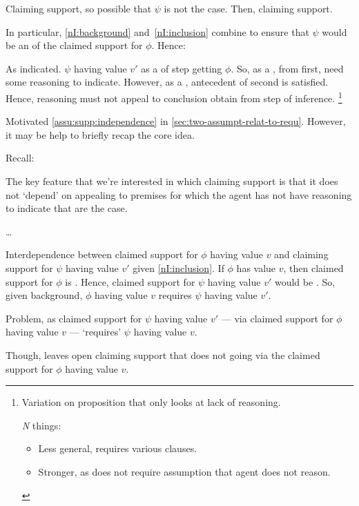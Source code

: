 \begin{note}
  Claiming support, so possible that \(\psi\) is not the case.
  Then, claiming support.

  In particular, \ref{nI:background} and~\ref{nI:inclusion} combine to ensure that \(\psi\) would be an \requ{} of the claimed support for \(\phi\).
  Hence:

  \begin{quote}
    \vspace{-\baselineskip}
    \assuCSRReq*
  \end{quote}

  As indicated.
  \(\psi\) having value \(v'\) as a \prequ{} of step getting \(\phi\).
  So, as a \requ{}, from first, need some reasoning to indicate.
  However, as a \prequ{}, antecedent of second is satisfied.
  Hence, reasoning must not appeal to conclusion obtain from step of inference.\nolinebreak
  \footnote{
    Variation on proposition that only looks at lack of reasoning.

    \emph{N} things:
    \begin{itemize}
    \item Less general, requires various clauses.
    \item Stronger, as does not require assumption that agent does not reason.
    \end{itemize}
  }

  Motivated \ref{assu:supp:independence} in \ref{sec:two-assumpt-relat-to-requ}.
  However, it may be help to briefly recap the core idea.

  Recall:
  \begin{quote}
    \vspace{-\baselineskip}
    \ideaEIS*
  \end{quote}
  The key feature that we're interested in which claiming support is that it does not `depend' on appealing to premises for which the agent has not have reasoning to indicate that are the case.

  {\color{red} \dots}
\end{note}


\begin{note}
  Interdependence between claimed support for \(\phi\) having value \(v\) and claiming support for \(\psi\) having value \(v'\) given \ref{nI:inclusion}.
  If \(\phi\) has value \(v\), then claimed support for \(\phi\) is \nmom{}.
  Hence, claimed support for \(\psi\) having value \(v'\) would be \nmom{}.
  So, given background, \(\phi\) having value \(v\) requires \(\psi\) having value \(v'\).

  Problem, as claimed support for \(\psi\) having value \(v'\) --- via claimed support for \(\phi\) having value \(v\) --- `requires' \(\psi\) having value \(v\).

  Though, leaves open claiming support that does not going via the claimed support for \(\phi\) having value \(v\).
\end{note}


